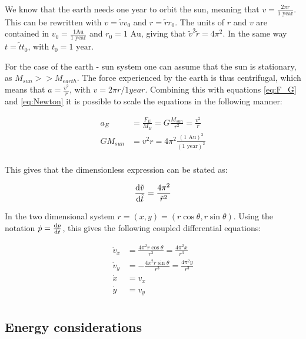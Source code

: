 We know that the earth needs one year to orbit the sun, meaning that $ v = \frac{2\pi r}{\text{1 year}} $. This can be rewritten with $ v = \tilde{v}v_0 $ and $ r = \tilde{r}r_0 $. The units of $ r $ and $ v $ are contained in  $ v_0 = \frac{1 \text{Au}}{1 \text{ year}} $ and $ r_0=1\text{ Au} $, giving that $ \tilde{v}^2\tilde{r} = 4\pi^2 $. In the same way $ t = \tilde{t}t_0 $, with $ t_0 = 1 \text{ year} $. 


For the case of the earth - sun system one can assume that the sun is stationary, as $ M_{sun}>> M_{earth} $. The force experienced by the earth is thus centrifugal, which means that $ a = \frac{v^2}{r} $, with $ v = 2\pi r /1year $.  
Combining this with equations \ref{eq:F_G} and \ref{eq:Newton} it is possible to scale the equations in the following manner:

\begin{align}
	{a}_E &= \frac{{F}_E}{M_E}= G\frac{M_{sun}}{r^2} 
= \frac{v^2}{r}\\
	GM_{sun}&= v^2 r = 4\pi^2 \frac{(\text{1 Au})^3}{(\text{1 year})^2}\\
\end{align}

This gives that the dimensionless expression can be stated as: 

	\begin{equation}
		\dv{\tilde{v}}{\tilde{t}} = \frac{4\pi^2}{\tilde{r}^2} 
	\end{equation}
	
In the two dimensional system $ r = (x,y) = (r\cos\theta, r\sin\theta) $. Using the notation $ 	\dot{p}  = \dv{p}{t}$, this gives the following coupled differential equations: 

\begin{align}
\dot{v}_x  &=  \frac{4\pi^2r\cos\theta}{{r}^3}  = \frac{4\pi^2x}{{r}^3}  \label{eq:vx}\\
\dot{v}_y	 &= -\frac{4\pi^2r\sin\theta}{{r}^3}  = \frac{4\pi^2y}{{r}^3 \label{eq:vy}}\\
	\dot{x}  &= v_x \label{eq:x}\\
	\dot{y}  &= v_y \label{eq:y}\\
\end{align}

\subsection{Energy considerations}


